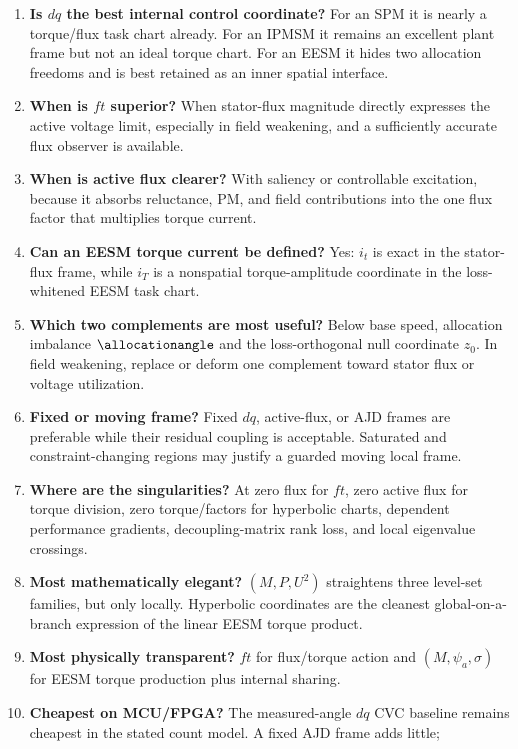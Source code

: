\begin{enumerate}
 \item \textbf{Is \(dq\) the best internal control coordinate?} For an SPM it
 is nearly a torque/flux task chart already. For an IPMSM it remains an
 excellent plant frame but not an ideal torque chart. For an EESM it hides two
 allocation freedoms and is best retained as an inner spatial interface.
 \item \textbf{When is \(ft\) superior?} When stator-flux magnitude directly
 expresses the active voltage limit, especially in field weakening, and a
 sufficiently accurate flux observer is available.
 \item \textbf{When is active flux clearer?} With saliency or controllable
 excitation, because it absorbs reluctance, PM, and field contributions into
 the one flux factor that multiplies torque current.
 \item \textbf{Can an EESM torque current be defined?} Yes: \(i_t\) is exact
 in the stator-flux frame, while \(i_T\) is a nonspatial torque-amplitude
 coordinate in the loss-whitened EESM task chart.
 \item \textbf{Which two complements are most useful?} Below base speed,
 allocation imbalance \(\allocationangle\) and the loss-orthogonal null coordinate
 \(z_0\). In field weakening, replace or deform one complement toward stator
 flux or voltage utilization.
 \item \textbf{Fixed or moving frame?} Fixed \(dq\), active-flux, or AJD
 frames are preferable while their residual coupling is acceptable. Saturated
 and constraint-changing regions may justify a guarded moving local frame.
 \item \textbf{Where are the singularities?} At zero flux for \(ft\), zero
 active flux for torque division, zero torque/factors for hyperbolic charts,
 dependent performance gradients, decoupling-matrix rank loss, and local
 eigenvalue crossings.
 \item \textbf{Most mathematically elegant?} \((M,P,U^2)\) straightens three
 level-set families, but only locally. Hyperbolic coordinates are the cleanest
 global-on-a-branch expression of the linear EESM torque product.
 \item \textbf{Most physically transparent?} \(ft\) for flux/torque action and
 \((M,\psi_a,\sigma)\) for EESM torque production plus internal sharing.
 \item \textbf{Cheapest on MCU/FPGA?} The measured-angle \(dq\) CVC baseline
 remains cheapest in the stated count model. A fixed AJD frame adds little;

\end{enumerate}
